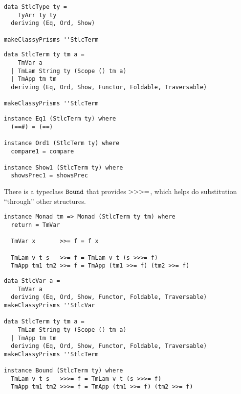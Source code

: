 \documentclass[aspectration=169]{beamer}
\begin{document}
\begin{frame}[fragile]
  \begin{verbatim}
data StlcType ty =
    TyArr ty ty
  deriving (Eq, Ord, Show)

makeClassyPrisms ''StlcTerm
  \end{verbatim}  
\end{frame}

\begin{frame}[fragile]
  \begin{verbatim}
data StlcTerm ty tm a =
    TmVar a
  | TmLam String ty (Scope () tm a)
  | TmApp tm tm
  deriving (Eq, Ord, Show, Functor, Foldable, Traversable)

makeClassyPrisms ''StlcTerm
  \end{verbatim}  
\end{frame}

\begin{frame}[fragile]
  \begin{verbatim}
instance Eq1 (StlcTerm ty) where
  (==#) = (==)

instance Ord1 (StlcTerm ty) where
  compare1 = compare

instance Show1 (StlcTerm ty) where
  showsPrec1 = showsPrec
  \end{verbatim}  
\end{frame}

\begin{frame}[c]
  \begin{center}
  There is a typeclass $\tt{Bound}$ that provides $\tt{>>>=}$, which helps do
  substitution ``through'' other structures.
  \end{center}
\end{frame}

\begin{frame}[fragile]
  \begin{verbatim}
instance Monad tm => Monad (StlcTerm ty tm) where
  return = TmVar 

  TmVar x       >>= f = f x

  TmLam v t s   >>= f = TmLam v t (s >>>= f)
  TmApp tm1 tm2 >>= f = TmApp (tm1 >>= f) (tm2 >>= f)
  \end{verbatim}  
\end{frame}

\begin{frame}[fragile]
  \begin{verbatim}
data StlcVar a =
    TmVar a
  deriving (Eq, Ord, Show, Functor, Foldable, Traversable)
makeClassyPrisms ''StlcVar

data StlcTerm ty tm a =
    TmLam String ty (Scope () tm a)
  | TmApp tm tm
  deriving (Eq, Ord, Show, Functor, Foldable, Traversable)
makeClassyPrisms ''StlcTerm

instance Bound (StlcTerm ty) where
  TmLam v t s   >>>= f = TmLam v t (s >>>= f)
  TmApp tm1 tm2 >>>= f = TmApp (tm1 >>= f) (tm2 >>= f)
  \end{verbatim}  
\end{frame}
\end{document}
